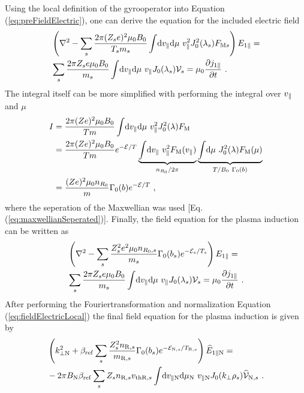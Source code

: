 Using the local definition of the gyrooperator into Equation (\ref{eq:preFieldElectric}), one can derive the equation for the included electric field 
\begin{gather}
    \begin{aligned}
        &\left(\nabla^2 - \sum_s \frac{2\pi (Z_se)^2 \mu_0 B_0}{T_sm_s}  \int \! \mathrm{d}v_\parallel\mathrm{d}\mu ~ v_\parallel^2 J_0^2(\lambda_s) F_{\mathrm{M}s} \right) E_{1\parallel} = \\
	    &\sum_s \frac{2\pi Z_se \mu_0 B_0}{m_s}  \int \! \mathrm{d}v_\parallel\mathrm{d}\mu ~ v_\parallel J_0(\lambda_s) \mathcal{V}_s = \mu_0 \frac{\partial j_{1\parallel}}{\partial t}~.
    \end{aligned}
	\label{eq:prefieldElectricLocal}
\end{gather}
The integral itself can be more simplified with performing the integral over $v_\parallel$ and $\mu$
\begin{gather}
	\begin{aligned}
		I &= \frac{2\pi (Ze)^2 \mu_0 B_0}{Tm}  \int \! \mathrm{d}v_\parallel\mathrm{d}\mu ~ v_\parallel^2 J_0^2(\lambda) F_\mathrm{M} \\
		  &= \frac{2\pi (Ze)^2 \mu_0 B_0}{Tm} e^{-\mathcal{E}/T} \underbrace{\int \! \mathrm{d}v_\parallel ~ v_\parallel^2 F_\mathrm{M}(v_\parallel)}_{n_{R_0}/2\pi} \underbrace{\int \! \mathrm{d}\mu ~ J_0^2(\lambda) F_\mathrm{M}(\mu)}_{T/B_0~\Gamma_0(b)} \\
		  &= \frac{(Ze)^2 \mu_0 n_{R_0}}{m} \Gamma_0(b) e^{-\mathcal{E}/T} ~,
	\end{aligned}
\end{gather}
where the seperation of the Maxwellian was used [Eq. (\ref{eq:maxwellianSeperated})]. Finally, the field equation for the plasma induction can be written as
\begin{gather}
    \begin{aligned}
        &\left(\nabla^2 - \sum_s \frac{Z_s^2e^2 \mu_0 n_{R_0,s}}{m_s} \Gamma_0(b_s) e^{-\mathcal{E}_s/T_s} \right) E_{1\parallel} = \\
	    &\sum_s \frac{2\pi Z_se \mu_0 B_0}{m_s}  \int \! \mathrm{d}v_\parallel\mathrm{d}\mu ~ v_\parallel J_0(\lambda_s) \mathcal{V}_s = \mu_0 \frac{\partial j_{1\parallel}}{\partial t}~.
    \end{aligned}
	\label{eq:fieldElectricLocal}
\end{gather}
After performing the Fouriertransformation and normalization Equation (\ref{eq:fieldElectricLocal}) the final field equation for the plasma induction is given by
\begin{gather}
    \begin{aligned}
        &\left(k_{\perp \mathrm{N}}^2 + \beta_\mathrm{ref} \sum_s \frac{Z^2_sn_{\mathrm{R},s}}{m_{\mathrm{R},s}} \Gamma_0(b_s) e^{-\mathcal{E}_{\mathrm{N},s}/T_{\mathrm{R},s}} \right) \widehat{E}_{1\parallel \mathrm{N}} = \\
        &- 2\pi B_\mathrm{N} \beta_\mathrm{ref} \sum_s Z_s n_{\mathrm{R},s} v_{\mathrm{th}\mathrm{R},s} \int \! \mathrm{d}v_{\parallel \mathrm{N}} \mathrm{d}\mu_\mathrm{N} ~ v_{\parallel \mathrm{N}} J_0(k_\perp \rho_s) \widehat{\mathcal{V}}_{\mathrm{N},s} ~.
    \end{aligned}
    \label{eq:fieldElectricLocalNorm}
\end{gather}
\newpage